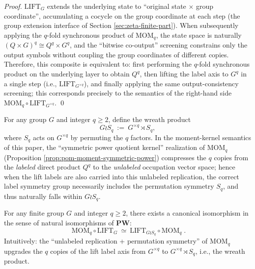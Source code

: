 \begin{proof}
\(\mathrm{LIFT}_G\) extends the underlying state to ``original state \(\times\) group coordinate'', accumulating a cocycle on the group coordinate at each step (the group extension interface of Section \ref{sec:zeta-finite-part}).
When subsequently applying the \(q\)-fold synchronous product of \(\mathrm{MOM}_q\), the state space is naturally \((Q\times G)^q\cong Q^q\times G^q\), and the ``bitwise co-output'' screening constrains only the output symbols without coupling the group coordinates of different copies.
Therefore, this composite is equivalent to: first performing the \(q\)-fold synchronous product on the underlying layer to obtain \(Q^q\), then lifting the label axis to \(G^q\) in a single step (i.e., \(\mathrm{LIFT}_{G^{\times q}}\)), and finally applying the same output-consistency screening; this corresponds precisely to the semantics of the right-hand side \(\mathrm{MOM}_q\circ \mathrm{LIFT}_{G^{\times q}}\). \qed
\end{proof}

\begin{definition}\label{def:pom-wreath-product}
For any group \(G\) and integer \(q\ge 2\), define the wreath product
\[
G\wr S_q\ :=\ G^{\times q}\rtimes S_q,
\]
where \(S_q\) acts on \(G^{\times q}\) by permuting the \(q\) factors.
In the moment-kernel semantics of this paper, the ``symmetric power quotient kernel'' realization of \(\mathrm{MOM}_q\) (Proposition \ref{prop:pom-moment-symmetric-power}) compresses the \(q\) copies from the \emph{labeled} direct product \(Q^q\) to the \emph{unlabeled} occupation vector space;
hence when the lift labels are also carried into this unlabeled replication, the correct label symmetry group necessarily includes the permutation symmetry \(S_q\), and thus naturally falls within \(G\wr S_q\).
\end{definition}

\begin{proposition}\label{prop:pom-mom-lift-wreath-exchange}\label{prop:pom-mom-lift-wreath}
For any finite group \(G\) and integer \(q\ge 2\), there exists a canonical isomorphism in the sense of natural isomorphisms of \(\mathbf{PW}\):
\[
\boxed{\;
\mathrm{MOM}_q\circ \mathrm{LIFT}_G
\ \simeq\
\mathrm{LIFT}_{G\wr S_q}\circ \mathrm{MOM}_q\; }.
\]
Intuitively: the ``unlabeled replication + permutation symmetry'' of \(\mathrm{MOM}_q\) upgrades the \(q\) copies of the lift label axis from \(G^{\times q}\) to \(G^{\times q}\rtimes S_q\), i.e., the wreath product.
\end{proposition}

